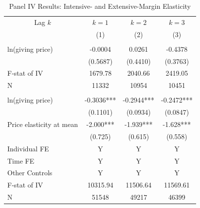 \documentclass[ review  , 3p ]{elsarticle}
\begin{document}
  \begin{table}

  \caption{\label{tab:kablePanelIVEstimateElasticityIntExt}Panel IV Results: Intensive- and Extensive-Margin Elasticity}
  \centering
  \begin{threeparttable}
  \begin{tabular}[t]{lccc}
  \toprule
  \multicolumn{1}{c}{Lag $k$} & \multicolumn{1}{c}{$k = 1$} & \multicolumn{1}{c}{$k = 2$} & \multicolumn{1}{c}{$k = 3$} \\
  \cmidrule(l{3pt}r{3pt}){1-1} \cmidrule(l{3pt}r{3pt}){2-2} \cmidrule(l{3pt}r{3pt}){3-3} \cmidrule(l{3pt}r{3pt}){4-4}
   & (1) & (2) & (3)\\
  \midrule
  \addlinespace[0.3em]
  \multicolumn{4}{l}{\textbf{Intensive Margin}}\\
  \hspace{1em}ln(giving price) & -0.0004 & 0.0261 & -0.4378\\
  \hspace{1em} & (0.5687) & (0.4410) & (0.3763)\\
  \hspace{1em}F-stat of IV & 1679.78 & 2040.66 & 2419.05\\
  \hspace{1em}N & 11332 & 10954 & 10451\\
  \addlinespace[0.3em]
  \multicolumn{4}{l}{\textbf{Extensive Margin}}\\
  \hspace{1em}ln(giving price) & -0.3036*** & -0.2944*** & -0.2472***\\
  \hspace{1em} & (0.1101) & (0.0934) & (0.0847)\\
  \hspace{1em}Price elasticity at mean & -2.000*** & -1.939*** & -1.628***\\
  \hspace{1em} & (0.725) & (0.615) & (0.558)\\
  \hspace{1em}Individual FE & Y & Y & Y\\
  \hspace{1em}Time FE & Y & Y & Y\\
  \hspace{1em}Other Controls & Y & Y & Y\\
  \hspace{1em}F-stat of IV & 10315.94 & 11506.64 & 11569.61\\
  \hspace{1em}N & 51548 & 49217 & 46399\\

\end{tabular}
\end{threeparttable}
\end{table}
\end{document}
